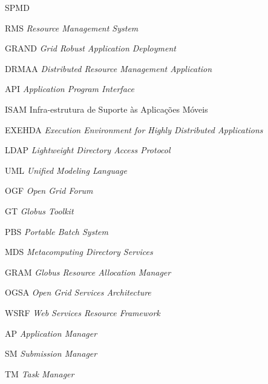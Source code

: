 
\tableofcontents


\begin{listofabbrv}{SPMD}
        \item[RMS]   \emph{Resource Management System}
        \item[GRAND] \emph{Grid Robust Application Deployment}
        \item[DRMAA] \emph{Distributed Resource Management Application}
        \item[API]   \emph{Application Program Interface}
        \item[ISAM]  Infra-estrutura de Suporte às Aplicações Móveis
        \item[EXEHDA]\emph{Execution Environment for Highly Distributed Applications}
        \item[LDAP]  \emph{Lightweight Directory Access Protocol}
        \item[UML]   \emph{Unified Modeling Language}
        \item[OGF]   \emph{Open Grid Forum}
        \item[GT]    \emph{Globus Toolkit}
        \item[PBS]   \emph{Portable Batch System}
        \item[MDS]   \emph{Metacomputing Directory Services}
        \item[GRAM]  \emph{Globus Resource Allocation Manager}
        \item[OGSA]  \emph{Open Grid Services Architecture}
        \item[WSRF]  \emph{Web Services Resource Framework}
        \item[AP]    \emph{Application Manager}
        \item[SM]    \emph{Submission Manager}
        \item[TM]    \emph{Task Manager}
\end{listofabbrv}


\listoffigures

\listoftables

